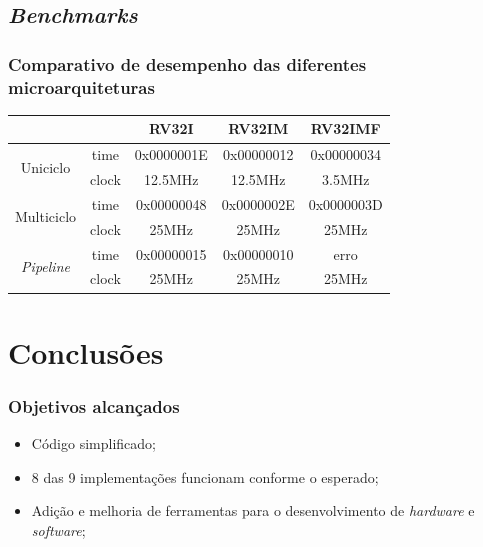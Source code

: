 \documentclass[aspectratio=169]{beamer}
\begin{document}
    \subsection{\textit{Benchmarks}}
    \begin{frame}
        \frametitle{Comparativo de desempenho das diferentes microarquiteturas}
        \vfill
        \begin{longtable}{cc|c|c|c|}
            \cline{3-5}
                                                                    &                               & RV32I       & RV32IM      & RV32IMF   \\
            \hline
            \endhead
            \multicolumn{1}{|c}{\multirow{2}{*}{{Uniciclo}}}        & \multicolumn{1}{|c|}{time}    & 0x0000001E  & 0x00000012  & 0x00000034 \\
            \cline{2-5}
            \multicolumn{1}{|c}{ }                                  & \multicolumn{1}{|c|}{clock}   & 12.5MHz     & 12.5MHz     & 3.5MHz \\
            \hline
            \multicolumn{1}{|c}{\multirow{2}{*}{{Multiciclo}}}      & \multicolumn{1}{|c|}{time}    & 0x00000048  & 0x0000002E  & 0x0000003D \\
            \cline{2-5}
            \multicolumn{1}{|c}{ }                                  & \multicolumn{1}{|c|}{clock}   & 25MHz       & 25MHz       & 25MHz \\
            \hline
            \multicolumn{1}{|c}{\multirow{2}{*}{\textit{Pipeline}}} & \multicolumn{1}{|c|}{time}    & 0x00000015  & 0x00000010  & erro \\
            \cline{2-5}
            \multicolumn{1}{|c}{ }                                  & \multicolumn{1}{|c|}{clock}   & 25MHz       & 25MHz       & 25MHz \\
            \hline
        \end{longtable}
        \vfill
    \end{frame}

\section{Conclusões}
    \begin{frame}
        \frametitle{Objetivos alcançados}
        \vfill
        \begin{itemize}
            \item Código simplificado;
            \item 8 das 9 implementações funcionam conforme o esperado;
            \item Adição e melhoria de ferramentas para o desenvolvimento de \textit{hardware} e \textit{software};
        \end{itemize}
        \vfill
    \end{frame}
\end{document}
